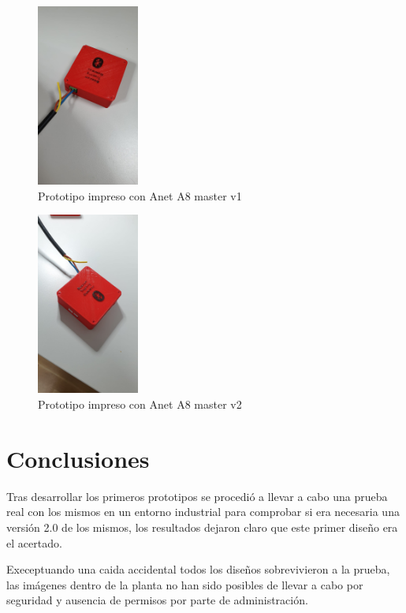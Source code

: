 \documentclass[a4paper ,12pt, onecolumn]{article}
\begin{document}
        \begin{center}
            \begin{figure}[h]
                \centering
                \includegraphics[width=0.3\textwidth]{../3d_master_1.jpeg}
                \caption{Prototipo impreso con Anet A8 master v1}
                \label{fig:mesh1}
            \end{figure}
        \end{center}
        \begin{center}
            \begin{figure}[h]
               \centering
                \includegraphics[width=0.3\textwidth]{../3d_master_2.jpeg}
                \caption{Prototipo impreso con Anet A8 master v2}
                \label{fig:mesh1}
            \end{figure}
        \end{center}

\section{Conclusiones}
    Tras desarrollar los primeros prototipos se procedió a llevar a cabo una prueba real con los mismos 
    en un entorno industrial para comprobar si era necesaria una versión 2.0 de los mismos, los resultados
    dejaron claro que este primer diseño era el acertado.

    Execeptuando una caida accidental todos los diseños sobrevivieron a la prueba, las imágenes dentro de la planta
    no han sido posibles de llevar a cabo por seguridad y ausencia de permisos por parte de administración.
\end{document}
